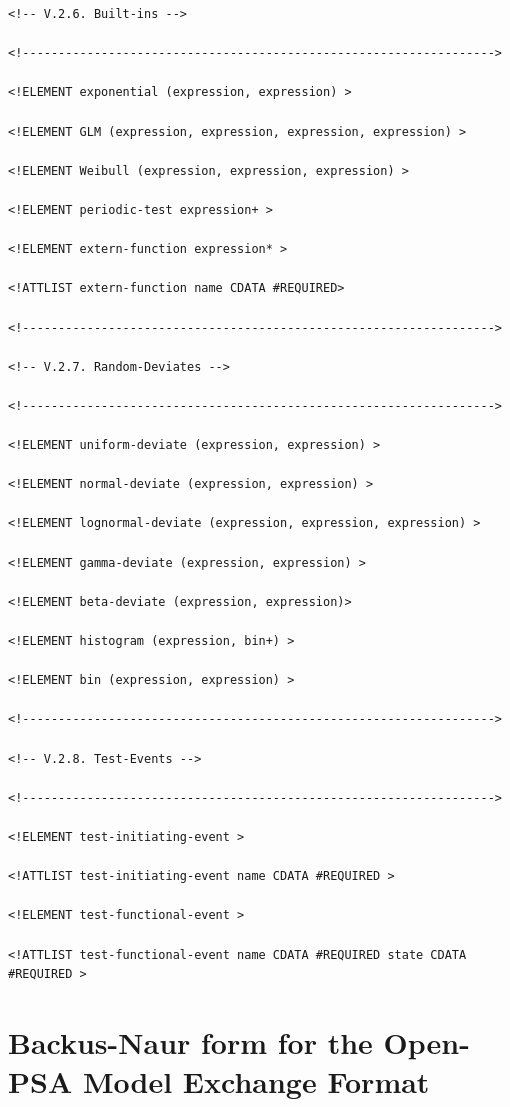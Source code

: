 \documentclass[11pt]{article}
\begin{document}
\begin{lstlisting}
<!-- V.2.6. Built-ins -->

<!------------------------------------------------------------------>

<!ELEMENT exponential (expression, expression) >

<!ELEMENT GLM (expression, expression, expression, expression) >

<!ELEMENT Weibull (expression, expression, expression) >

<!ELEMENT periodic-test expression+ >

<!ELEMENT extern-function expression* >

<!ATTLIST extern-function name CDATA #REQUIRED>

<!------------------------------------------------------------------>

<!-- V.2.7. Random-Deviates -->

<!------------------------------------------------------------------>

<!ELEMENT uniform-deviate (expression, expression) >

<!ELEMENT normal-deviate (expression, expression) >

<!ELEMENT lognormal-deviate (expression, expression, expression) >

<!ELEMENT gamma-deviate (expression, expression) >

<!ELEMENT beta-deviate (expression, expression)>

<!ELEMENT histogram (expression, bin+) >

<!ELEMENT bin (expression, expression) >

<!------------------------------------------------------------------>

<!-- V.2.8. Test-Events -->

<!------------------------------------------------------------------>

<!ELEMENT test-initiating-event >

<!ATTLIST test-initiating-event name CDATA #REQUIRED >

<!ELEMENT test-functional-event >

<!ATTLIST test-functional-event name CDATA #REQUIRED state CDATA
#REQUIRED >
\end{lstlisting}

\section{Backus-Naur form for the Open-PSA Model Exchange Format}
\label{sec:orgf1d5a66}
\end{document}
